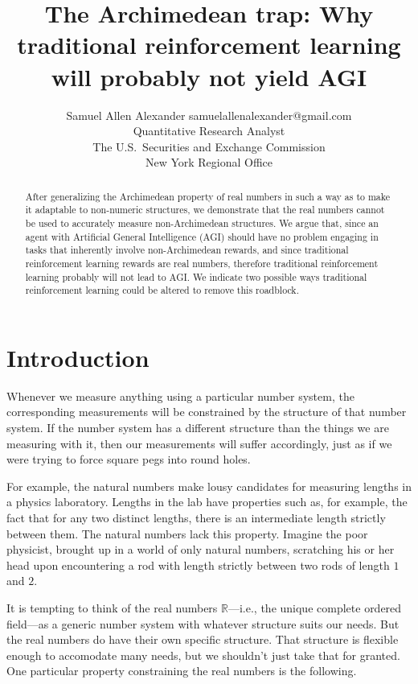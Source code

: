 \documentclass[twoside,11pt]{article}
\author{\name Samuel Allen Alexander
\email samuelallenalexander@gmail.com \\
\addr Quantitative Research Analyst\\
The U.S.\ Securities and Exchange Commission\\
New York Regional Office
}
\title{The Archimedean trap: Why
traditional reinforcement learning will probably not yield AGI}
\begin{document}
\maketitle

\begin{abstract}
    After generalizing the Archimedean property of real numbers in such a
    way as to make it adaptable to non-numeric structures, we demonstrate
    that the real numbers cannot be used to accurately measure non-Archimedean
    structures. We argue that, since an agent with Artificial General
    Intelligence (AGI) should have no problem engaging in tasks that inherently
    involve non-Archimedean rewards, and since traditional reinforcement
    learning rewards are real numbers, therefore traditional reinforcement
    learning probably will not lead to AGI. We indicate two possible ways traditional
    reinforcement learning could be altered to remove this roadblock.
\end{abstract}

\section{Introduction}

Whenever we measure anything using a particular number system, the
corresponding measurements will be constrained by the structure of that
number system. If the number system has a different structure than
the things we are measuring with it, then our
measurements will suffer accordingly, just as if we were trying to
force square pegs into round holes.

For example, the natural numbers make lousy candidates for measuring
lengths in a physics laboratory. Lengths in the lab have
properties such as, for example, the fact that for any two distinct
lengths, there is an intermediate length strictly between them.
The natural numbers lack this property. Imagine the poor physicist,
brought up in a world of only natural numbers, scratching his or her
head upon encountering a rod with length strictly between two rods
of length $1$ and $2$.

It is tempting to think of the real numbers $\mathbb R$---i.e., the unique
complete ordered field---as a generic number system with whatever
structure suits our needs. But the
real numbers do have their own specific structure. That structure is
flexible enough to accomodate many needs, but we shouldn't just
take that for granted. One particular property constraining the real numbers
is the following.
\end{document}
